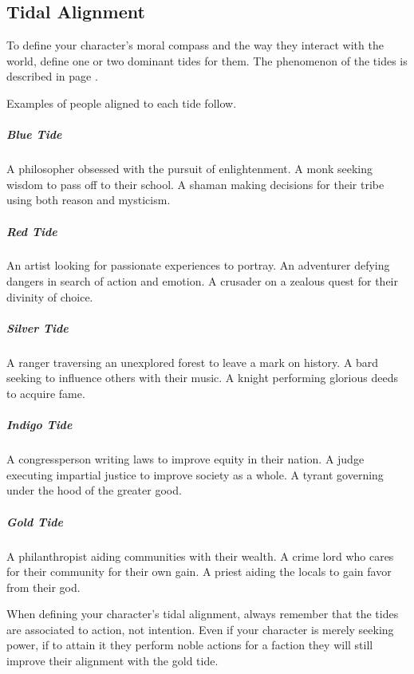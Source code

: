 \subsection*{Tidal Alignment}
    To define your character's moral compass and the way they interact with the world, define one or two dominant tides for them.
    The phenomenon of the tides is described in page \pageref{ssec::tides}.

    Examples of people aligned to each tide follow.

    \subparagraph{Blue Tide} A philosopher obsessed with the pursuit of enlightenment.
        A monk seeking wisdom to pass off to their school.
        A shaman making decisions for their tribe using both reason and mysticism.

    \subparagraph{Red Tide} An artist looking for passionate experiences to portray.
        An adventurer defying dangers in search of action and emotion.
        A crusader on a zealous quest for their divinity of choice.

    \subparagraph{Silver Tide} A ranger traversing an unexplored forest to leave a mark on history.
        A bard seeking to influence others with their music.
        A knight performing glorious deeds to acquire fame.

    \subparagraph{Indigo Tide} A congressperson writing laws to improve equity in their nation.
        A judge executing impartial justice to improve society as a whole.
        A tyrant governing under the hood of the greater good.

    \subparagraph{Gold Tide} A philanthropist aiding communities with their wealth.
        A crime lord who cares for their community for their own gain.
        A priest aiding the locals to gain favor from their god.

    When defining your character's tidal alignment, always remember that the tides are associated to action, not intention.
    Even if your character is merely seeking power, if to attain it they perform noble actions for a faction they will still improve their alignment with the gold tide.


